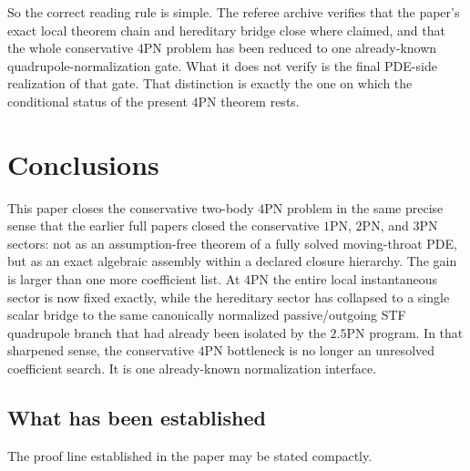 \documentclass[11pt]{article}
\begin{document}
So the correct reading rule is simple.  The referee archive verifies that the
paper's exact local theorem chain and hereditary bridge close where claimed, and
that the whole conservative $4$PN problem has been reduced to one already-known
quadrupole-normalization gate.  What it does not verify is the final PDE-side
realization of that gate.  That distinction is exactly the one on which the
conditional status of the present $4$PN theorem rests.


\section{Conclusions}
\label{sec:conclusions}

This paper closes the conservative two-body $4$PN problem in the same precise
sense that the earlier full papers closed the conservative $1$PN, $2$PN, and
$3$PN sectors: not as an assumption-free theorem of a fully solved
moving-throat PDE, but as an exact algebraic assembly within a declared closure
hierarchy.  The gain is larger than one more coefficient list.  At $4$PN the
entire local instantaneous sector is now fixed exactly, while the hereditary
sector has collapsed to a single scalar bridge to the same canonically
normalized passive/outgoing STF quadrupole branch that had already been
isolated by the $2.5$PN program.  In that sharpened sense, the conservative
$4$PN bottleneck is no longer an unresolved coefficient search.  It is one
already-known normalization interface.

\subsection{What has been established}
\label{sec:conclusions-established}

The proof line established in the paper may be stated compactly.
\end{document}
